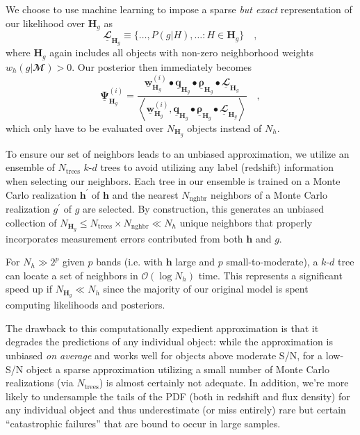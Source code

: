 \documentclass[a4paper,fleqn,usenatbib,english]{mnras}
\newcommand{\rom}[2]{\ensuremath{#1_{\mathrm{#2}}}} %
\begin{document}
We choose to use machine learning to impose a sparse \textit{but exact} representation of our likelihood over $\mathbf{H}_g$ as
\begin{equation}
\underline{\mathbfcal{L}}_{\mathbf{H}_g} \equiv \lbrace \ldots, P(g|H), \ldots : H \in \mathbf{H}_g \rbrace \quad ,
\end{equation}
where $\mathbf{H}_g$ again includes all objects with non-zero neighborhood weights $w_h(g|\mathbfcal{M})>0$. Our posterior then immediately becomes
\begin{equation}
\underline{\boldsymbol{\Psi}}_{\mathbf{H}_g}^{(i)} = \frac{\underline{\mathbf{w}}_{\mathbf{H}_g}^{(i)} \bullet \underline{\mathbf{q}}_{\mathbf{H}_g} \bullet \underline{\boldsymbol{\rho}}_{{\mathbf{H}_g}} \bullet \underline{\mathbfcal{L}}_{\mathbf{H}_g}}{\left\langle \underline{\mathbf{w}}_{\mathbf{H}_g}^{(i)} , \underline{\mathbf{q}}_{\mathbf{H}_g} \bullet \underline{\boldsymbol{\rho}}_{\mathbf{H}_g} \bullet \underline{\mathbfcal{L}}_{\mathbf{H}_g} \right\rangle} \quad ,
\end{equation}
which only have to be evaluated over $N_{\mathbf{H}_g}$ objects instead of $N_h$.

To ensure our set of neighbors leads to an unbiased approximation, we utilize an ensemble of $\rom{N}{trees}$ $k$-$d$ trees \citep{bentley75} to avoid utilizing any label (redshift) information when selecting our neighbors. Each tree in our ensemble is trained on a Monte Carlo realization $\mathbf{h}^\prime$ of $\mathbf{h}$ and the nearest $\rom{N}{nghbr}$ neighbors of a Monte Carlo realization $g^\prime$ of $g$ are selected. By construction, this generates an unbiased collection of $N_{\mathbf{H}_g} \leq \rom{N}{trees} \times \rom{N}{nghbr} \ll N_h$ unique neighbors that properly incorporates measurement errors contributed from both $\mathbf{h}$ and $g$.

For $N_h \gg 2^p$ given $p$ bands (i.e. with $\mathbf{h}$ large and $p$ small-to-moderate), a $k$-$d$ tree can locate a set of neighbors in $\mathcal{O}(\log N_h)$ time. This represents a significant speed up if $N_{\mathbf{H}_g} \ll N_h$ since the majority of our original model is spent computing likelihoods and posteriors.

The drawback to this computationally expedient approximation is that it degrades the predictions of any individual object: while the approximation is unbiased \textit{on average} and works well for objects above moderate S/N, for a low-S/N object a sparse approximation utilizing a small number of Monte Carlo realizations (via $\rom{N}{trees}$) is almost certainly not adequate. In addition, we're more likely to undersample the tails of the PDF (both in redshift and flux density) for any individual object and thus underestimate (or miss entirely) rare but certain ``catastrophic failures'' that are bound to occur in large samples.
\end{document}
